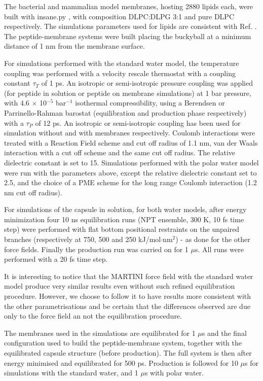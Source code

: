 The bacterial and mammalian model membranes, hosting 2880 lipids each, were built with insane.py \cite{Wassenaar2015}, with composition DLPC:DLPG 3:1 and pure DLPC respectively. The simulations parameters used for lipids are consistent with Ref. \cite{SiewertJ.Marrink2003}. The peptide-membrane systems were built placing the buckyball at a minimum distance of 1 nm from the membrane surface.

For simulations performed with the standard water model, the temperature coupling was performed with a velocity rescale thermostat \cite{Bussi2007} with a coupling constant $\tau _T$ of 1 ps. An isotropic or semi-isotropic pressure coupling was applied (for peptide in solution or peptide on membrane simulations) at 1 bar pressure, with 4.6 $\times$ 10$^{-5}$ bar$^{-1}$ isothermal compressibility, using a Berendsen \cite{Berendsen1984} or Parrinello-Rahman barostat \cite{Parrinello1981} (equilibration and production phase respectively) with a $\tau _P$ of 12 ps. An isotropic or semi-isotropic coupling has been used for simulation without and with membranes respectively.
%
Coulomb interactions were treated with a Reaction Field scheme \cite{Tironi1995} and cut off radius of 1.1 nm, van der Waals interaction with a cut off scheme and the same cut off radius. The relative dielectric constant is set to 15.
%
Simulations performed with the polar water model were run with the parameters above, except the relative dielectric constant set to 2.5, and the choice of a PME scheme for the long range Coulomb interaction (1.2 nm cut off radius).

For simulations of the capsule in solution, for both water models, after energy minimization four 10 ns equilibration runs (NPT ensemble, 300 K, 10 fs time step) were performed with flat bottom positional restraints on the unpaired branches (respectively at 750, 500 and 250 kJ/mol$\cdot$nm$^2$) - as done for the other force fields.
%
Finally the production run was carried on for 1 $\mu$s. All runs were performed with a 20 fs time step.

It is interesting to notice that the MARTINI force field with the standard water model produce very similar results even without such refined equilibration procedure. However, we choose to follow it to have results more consistent with the other parametrisations and be certain that the differences observed are due only to the force field an not the equilibration procedure.

The membranes used in the simulations are equilibrated for 1 $\mu$s and the final configuration used to build the peptide-membrane system, together with the equilibrated capsule structure (before production). The full system is then after energy minimised and equilibrated for 500 ps.
%
Production is followed for 10 $\mu$s for simulations with the standard water, and 1 $\mu$s with polar water.

